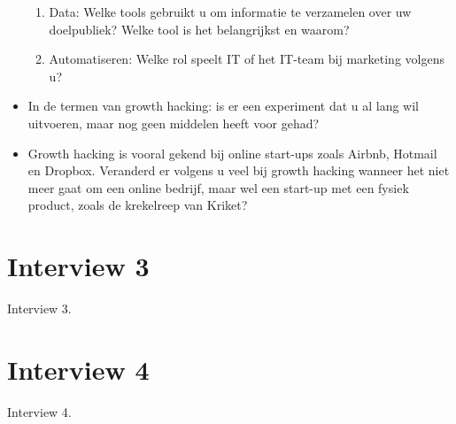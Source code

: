 \begin{itemize}
\begin{enumerate}[label*=\arabic*.]
		
		
		\item Data: Welke tools gebruikt u om informatie te verzamelen over uw doelpubliek? Welke tool is het belangrijkst en waarom?
		
		
		
		\item Automatiseren: Welke rol speelt IT of het IT-team bij marketing volgens u? 
		
		
		
	\end{enumerate}
	\item In de termen van growth hacking: is er een experiment dat u al lang wil uitvoeren, maar nog geen middelen heeft voor gehad?
	
	
	
	\item Growth hacking is vooral gekend bij online start-ups zoals Airbnb, Hotmail en Dropbox. Veranderd er volgens u veel bij growth hacking wanneer het niet meer gaat om een online bedrijf, maar wel een start-up met een fysiek product, zoals de krekelreep van Kriket?
	
	
	
\end{itemize}


\section{Interview 3}
\label{sec:interview-3}

Interview 3.

\section{Interview 4}
\label{sec:interview-4}

Interview 4.